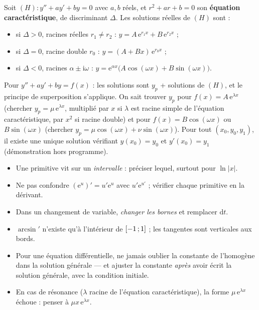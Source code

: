 
\begin{theoreme}
Soit $(H):y''+ay'+by=0$ avec $a,b$ réels, et $r^{2}+ar+b=0$ son
\textbf{équation caractéristique}, de discriminant $\Delta$. Les solutions
réelles de $(H)$ sont :
\begin{itemize}[label={\color{otNavy}\textbullet},leftmargin=1.4em,itemsep=0.6mm,topsep=0.8mm]
  \item si $\Delta>0$, racines réelles $r_1\neq r_2$ :
    $y=A\,\mathrm{e}^{r_1x}+B\,\mathrm{e}^{r_2x}$ ;
  \item si $\Delta=0$, racine double $r_0$ :
    $y=(A+Bx)\,\mathrm{e}^{r_0x}$ ;
  \item si $\Delta<0$, racines $\alpha\pm\mathrm{i}\omega$ :
    $y=\mathrm{e}^{\alpha x}\bigl(A\cos(\omega x)+B\sin(\omega x)\bigr)$.
\end{itemize}
\end{theoreme}

\begin{propriete}
Pour $y''+ay'+by=f(x)$ : les solutions sont $y_p$ + solutions de $(H)$, et
le principe de superposition s'applique. On sait trouver $y_p$ pour
$f(x)=A\,\mathrm{e}^{\lambda x}$ (chercher $y_p=\mu\,\mathrm{e}^{\lambda x}$, multiplié
par $x$ si $\lambda$ est racine simple de l'équation caractéristique, par $x^{2}$ si
racine double) et pour $f(x)=B\cos(\omega x)$ ou $B\sin(\omega x)$ (chercher
$y_p=\mu\cos(\omega x)+\nu\sin(\omega x)$). Pour tout $(x_0,y_0,y_1)$, il
existe une unique solution vérifiant $y(x_0)=y_0$ et $y'(x_0)=y_1$
(démonstration hors programme).
\end{propriete}

\begin{attention}
\begin{itemize}[label={\color{otOrange}\textbullet},leftmargin=1.4em,itemsep=0.6mm,topsep=0.5mm]
  \item Une primitive vit sur un \emph{intervalle} : préciser lequel, surtout pour $\ln|x|$.
  \item Ne pas confondre $(\mathrm{e}^{u})'=u'\mathrm{e}^{u}$ avec $u'\mathrm{e}^{u'}$ ; vérifier chaque
    primitive en la dérivant.
  \item Dans un changement de variable, \emph{changer les bornes} et remplacer $\mathrm{d}t$.
  \item $\arcsin'$ n'existe qu'à l'intérieur de $\mathopen{[}-1\,{;}\,1\mathclose{]}$ ; les tangentes sont verticales aux bords.
  \item Pour une équation différentielle, ne jamais oublier la constante de
    l'homogène dans la solution générale — et ajuster la constante \emph{après}
    avoir écrit la solution générale, avec la condition initiale.
  \item En cas de résonance ($\lambda$ racine de l'équation caractéristique),
    la forme $\mu\,\mathrm{e}^{\lambda x}$ échoue : penser à $\mu x\,\mathrm{e}^{\lambda x}$.
\end{itemize}
\end{attention}

